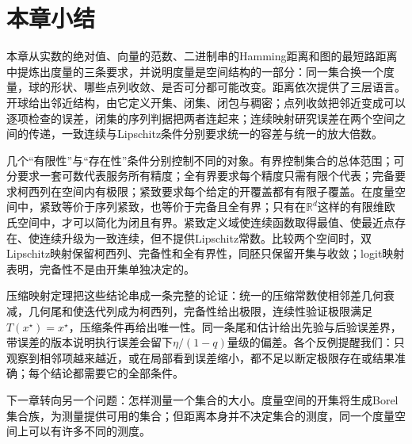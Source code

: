\section{本章小结}
\label{sec:metric-summary}

本章从实数的绝对值、向量的范数、二进制串的Hamming距离和图的最短路距离中提炼出度量的三条要求，并说明度量是空间结构的一部分：同一集合换一个度量，球的形状、哪些点列收敛、是否可分都可能改变。距离依次提供了三层语言。开球给出邻近结构，由它定义开集、闭集、闭包与稠密；点列收敛把邻近变成可以逐项检查的误差，闭集的序列判据把两者连起来；连续映射研究误差在两个空间之间的传递，一致连续与Lipschitz条件分别要求统一的容差与统一的放大倍数。

几个“有限性”与“存在性”条件分别控制不同的对象。有界控制集合的总体范围；可分要求一套可数代表服务所有精度；全有界要求每个精度只需有限个代表；完备要求柯西列在空间内有极限；紧致要求每个给定的开覆盖都有有限子覆盖。在度量空间中，紧致等价于序列紧致，也等价于完备且全有界；只有在$\mathbb R^d$这样的有限维欧氏空间中，才可以简化为闭且有界。紧致定义域使连续函数取得最值、使最近点存在、使连续升级为一致连续，但不提供Lipschitz常数。比较两个空间时，双Lipschitz映射保留柯西列、完备性和全有界性，同胚只保留开集与收敛；logit映射表明，完备性不是由开集单独决定的。

压缩映射定理把这些结论串成一条完整的论证：统一的压缩常数使相邻差几何衰减，几何尾和使迭代列成为柯西列，完备性给出极限，连续性验证极限满足$T(x^\star)=x^\star$，压缩条件再给出唯一性。同一条尾和估计给出先验与后验误差界，带误差的版本说明执行误差会留下$\eta/(1-q)$量级的偏差。各个反例提醒我们：只观察到相邻项越来越近，或在局部看到误差缩小，都不足以断定极限存在或结果准确；每个结论都需要它的全部条件。

下一章转向另一个问题：怎样测量一个集合的大小。度量空间的开集将生成Borel集合族，为测量提供可用的集合；但距离本身并不决定集合的测度，同一个度量空间上可以有许多不同的测度。
